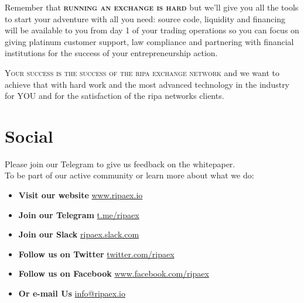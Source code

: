 \documentclass[11pt,fleqn,oneside]{book} %
\begin{document}
Remember that \textbf{\textsc{running an exchange is hard}} but we'll give you all the tools to start your adventure with all you need:
source code, liquidity and financing will be available to you from day 1 of your trading operations so you can focus on giving
platinum customer support, law compliance and partnering with financial institutions for the success of your entrepreneurship action.

\textsc{Your success is the success of the ripa exchange network} and we want to achieve that with hard work and the most advanced
technology in the industry for \textsc{YOU} and for the satisfaction of the ripa networks clients.

\newpage
\section{Social}
Please join our Telegram to give us feedback on the whitepaper.\\

To be part of our active community or learn more about what we do:
\begin{itemize}
	\item \textbf{Visit our website} \href{https://www.ripaex.io}{www.ripaex.io} 
	\item \textbf{Join our Telegram} \href{https://t.me/ripaex}{t.me/ripaex}
	\item \textbf{Join our Slack} \href{https://join.slack.com/t/ripaex/shared_invite/enQtMzM4NzUwNjU4OTQ0LTY3MDJmMTdhYTNlZjJlNGUxNzM1YjUwYjgyYjZlMDJmOTg3NTIzNThmNTYyMGQ3ODBkOTRmYzk3Y2Y4MzBkOTY}{ripaex.slack.com}
	\item \textbf{Follow us on Twitter} \href{https://twitter.com/ripaex}{twitter.com/ripaex}
	\item \textbf{Follow us on Facebook} \href{https://www.facebook.com/ripaex}{www.facebook.com/ripaex}
	\item \textbf{Or e-mail Us} \href{mailto:info@ripaex.io}{info@ripaex.io}
\end{itemize}

\end{document}

